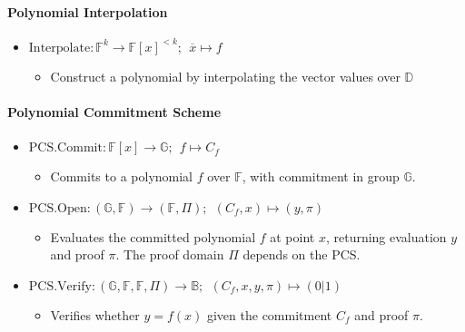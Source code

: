 \documentclass[
]{article}
\providecommand{\tightlist}{%
  \setlength{\itemsep}{0pt}\setlength{\parskip}{0pt}}
\begin{document}
\hypertarget{polynomial-interpolation}{%
\paragraph{Polynomial Interpolation}\label{polynomial-interpolation}}

\begin{itemize}
\tightlist
\item
  \(\text{Interpolate}: \mathbb{F}^k \to \mathbb{F}[x]^{< k};\ \ \overline{x} \mapsto f\)

  \begin{itemize}
  \tightlist
  \item
    Construct a polynomial by interpolating the vector values over
    \(\mathbb{D}\)
  \end{itemize}
\end{itemize}

\hypertarget{polynomial-commitment-scheme}{%
\paragraph{Polynomial Commitment
Scheme}\label{polynomial-commitment-scheme}}

\begin{itemize}
\tightlist
\item
  \(\text{PCS.Commit}: \mathbb{F}[x] \to \mathbb{G};\ \ f \mapsto C_f\)

  \begin{itemize}
  \tightlist
  \item
    Commits to a polynomial \(f\) over \(\mathbb{F}\), with commitment
    in group \(\mathbb{G}\).
  \end{itemize}
\item
  \(\text{PCS.Open}: (\mathbb{G}, \mathbb{F}) \to (\mathbb{F}, \Pi);\ \ (C_f, x) \mapsto (y,\pi)\)

  \begin{itemize}
  \tightlist
  \item
    Evaluates the committed polynomial \(f\) at point \(x\), returning
    evaluation \(y\) and proof \(\pi\). The proof domain \(\Pi\) depends
    on the PCS.
  \end{itemize}
\item
  \(\text{PCS.Verify}: (\mathbb{G}, \mathbb{F}, \mathbb{F}, \Pi) \to \mathbb{B};\ \ (C_f,x,y ,\pi) \mapsto (0|1)\)

  \begin{itemize}
  \tightlist
  \item
    Verifies whether \(y = f(x)\) given the commitment \(C_f\) and proof
    \(\pi\).
  \end{itemize}
\end{itemize}
\end{document}
